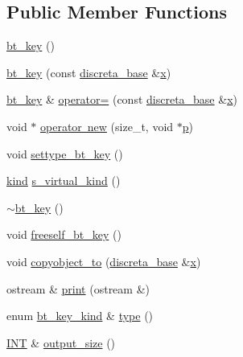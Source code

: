 \subsection*{Public Member Functions}
\begin{DoxyCompactItemize}
\item 
\mbox{\hyperlink{classbt__key_a711cbed5ca8722346862b155d6f2cb3e}{bt\+\_\+key}} ()
\item 
\mbox{\hyperlink{classbt__key_a64ff7f7d1285c8b5512c34f48561853f}{bt\+\_\+key}} (const \mbox{\hyperlink{classdiscreta__base}{discreta\+\_\+base}} \&\mbox{\hyperlink{alphabet2_8_c_a6150e0515f7202e2fb518f7206ed97dc}{x}})
\item 
\mbox{\hyperlink{classbt__key}{bt\+\_\+key}} \& \mbox{\hyperlink{classbt__key_a5258ebd54987d2152544e63a34c2bc2a}{operator=}} (const \mbox{\hyperlink{classdiscreta__base}{discreta\+\_\+base}} \&\mbox{\hyperlink{alphabet2_8_c_a6150e0515f7202e2fb518f7206ed97dc}{x}})
\item 
void $\ast$ \mbox{\hyperlink{classbt__key_adb8126830e966050ea93d1b2c32c0d07}{operator new}} (size\+\_\+t, void $\ast$\mbox{\hyperlink{alphabet2_8_c_a533391314665d6bf1b5575e9a9cd8552}{p}})
\item 
void \mbox{\hyperlink{classbt__key_a352bb10beb7c789d8d29373035824800}{settype\+\_\+bt\+\_\+key}} ()
\item 
\mbox{\hyperlink{discreta_8h_aaf25ee7e2306d78c74ec7bc48f092e81}{kind}} \mbox{\hyperlink{classbt__key_a53b7441523674e20f5c8f5c81eaccad4}{s\+\_\+virtual\+\_\+kind}} ()
\item 
\mbox{\hyperlink{classbt__key_a8b505bfd4e2f8b4806575070972d2b7d}{$\sim$bt\+\_\+key}} ()
\item 
void \mbox{\hyperlink{classbt__key_aad1f5a9b943d3ae072f1d09a9bb126c6}{freeself\+\_\+bt\+\_\+key}} ()
\item 
void \mbox{\hyperlink{classbt__key_ae97899364f826bc3d16cce36b9c8e4f7}{copyobject\+\_\+to}} (\mbox{\hyperlink{classdiscreta__base}{discreta\+\_\+base}} \&\mbox{\hyperlink{alphabet2_8_c_a6150e0515f7202e2fb518f7206ed97dc}{x}})
\item 
ostream \& \mbox{\hyperlink{classbt__key_aee0bad4deaf27c20d15d97050d3af150}{print}} (ostream \&)
\item 
enum \mbox{\hyperlink{discreta_8h_ac90b3b8c242d6128eb9985cfb7f77053}{bt\+\_\+key\+\_\+kind}} \& \mbox{\hyperlink{classbt__key_ae788a415a20f75fe7160408a055bb33f}{type}} ()
\item 
\mbox{\hyperlink{galois_8h_a09fddde158a3a20bd2dcadb609de11dc}{I\+NT}} \& \mbox{\hyperlink{classbt__key_acb48f95d030f62c56051d0cd6e013394}{output\+\_\+size}} ()

\end{DoxyCompactItemize}
